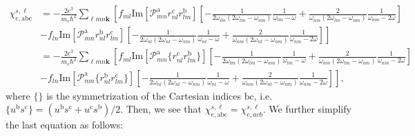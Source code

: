 \begin{align}\label{pfen3} 
\chi_{e,\mathrm{a}\mathrm{b}\mathrm{c}}^{s,\ell}
&= 
-\frac{2e^3}{m_e\hbar^2} 
\sum_{\ell m n\mathbf{k}}
\left[ 
f_{ml}\mathrm{Im}[\mathcal{P}^{\mathrm{a}}_{mn}r^{\mathrm{c}}_{nl}r^{\mathrm{b}}_{lm}] 
\left[
-\frac{1}{2\omega_{lm}(2\omega_{lm}-\omega_{nm})}\frac{1}{\omega_{lm}-\omega}
+\frac{2}{\omega_{nm}(2\omega_{lm}-\omega_{nm})}\frac{1}{\omega_{nm}-2\omega}
\right]
\right.
\nonumber\\
&-
\left. 
f_{ln}\mathrm{Im}[\mathcal{P}^{\mathrm{a}}_{mn}r^{\mathrm{b}}_{nl}r^{\mathrm{c}}_{lm}]
\left[
-\frac{1}{2\omega_{nl}(2\omega_{nl}-\omega_{nm})}\frac{1}{\omega_{nl}-\omega}
+\frac{2}{\omega_{nm}(2\omega_{nl}-\omega_{nm})}\frac{1}{\omega_{nm}-2\omega}
\right]
\right]
\nonumber\\
&= 
-\frac{2e^3}{m_e\hbar^2} 
\sum_{\ell m n\mathbf{k}}
\left[ 
f_{ml}\mathrm{Im}[\mathcal{P}^{\mathrm{a}}_{mn}\{r^{\mathrm{c}}_{nl}r^{\mathrm{b}}_{lm}\}] 
\left[
-\frac{1}{2\omega_{lm}(2\omega_{lm}-\omega_{nm})}\frac{1}{\omega_{lm}-\omega}
+\frac{2}{\omega_{nm}(2\omega_{lm}-\omega_{nm})}\frac{1}{\omega_{nm}-2\omega}
\right]
\right.
\nonumber\\
&-
\left. 
f_{ln}\mathrm{Im}[\mathcal{P}^{\mathrm{a}}_{mn}\{r^{\mathrm{b}}_{nl}r^{\mathrm{c}}_{lm}\}]
\left[
-\frac{1}{2\omega_{nl}(2\omega_{nl}-\omega_{nm})}\frac{1}{\omega_{nl}-\omega}
+\frac{2}{\omega_{nm}(2\omega_{nl}-\omega_{nm})}\frac{1}{\omega_{nm}-2\omega}
\right]
\right]
,
\end{align}  
where $\{\}$ is the symmetrization of the Cartesian indices $\mathrm{b}\mathrm{c}$, i.e. 
$\{u^{\mathrm{b}}s^{\mathrm{c}}\}=(u^{\mathrm{b}}s^{\mathrm{c}}+u^{\mathrm{c}}s^{\mathrm{b}})/2$. 
Then, we see that
$\chi_{e,\mathrm{a}\mathrm{b}\mathrm{c}}^{s,\ell}=\chi_{e,acb}^{s,\ell}$. We further simplify 
the last equation as follows:
